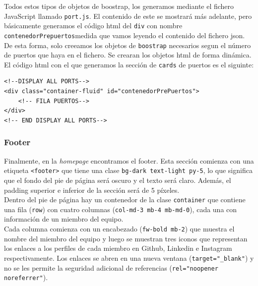 \documentclass{article}
\begin{document}
Todos estos tipos de objetos de boostrap, los generamos mediante el fichero JavaScript llamado \texttt{port.js}. El contenido de este se mostrará más adelante, pero básicamente generamos el código html del \texttt{div} con nombre \texttt{contenedorPrepuertos}medida que vamos leyendo el contenido del fichero json. De esta forma, solo creeamos los objetos de \texttt{boostrap} necesarios segun el número de puertos que haya en el fichero. Se crearan los objetos html de forma dinámica.\\

\noindent El código html con el que generamos la sección de \texttt{cards} de puertos es el siguinte:
\begin{verbatim}
<!--DISPLAY ALL PORTS-->
<div class="container-fluid" id="contenedorPrePuertos">
    <!-- FILA PUERTOS-->
</div>
<!-- END DISPLAY ALL PORTS-->
\end{verbatim}

\subsubsection{Footer}
Finalmente, en la \textit{homepage} encontramos el footer. Esta sección comienza con una etiqueta \texttt{<footer>} que tiene una clase \texttt{bg-dark text-light py-5}, lo que significa que el fondo del pie de página será oscuro y el texto será claro. Además, el padding superior e inferior de la sección será de 5 píxeles.\\

\noindent Dentro del pie de página hay un contenedor de la clase \texttt{container} que contiene una fila (\texttt{row}) con cuatro columnas (\texttt{col-md-3 mb-4 mb-md-0}), cada una con información de un miembro del equipo.\\

\noindent Cada columna comienza con un encabezado (\texttt{fw-bold mb-2}) que muestra el nombre del miembro del equipo y luego se muestran tres iconos que representan los enlaces a los perfiles de cada miembro en Github, Linkedin e Instagram respectivamente. Los enlaces se abren en una nueva ventana (\texttt{target="\_blank"}) y no se les permite la seguridad adicional de referencias (\texttt{rel="noopener noreferrer"}).\\
\end{document}
